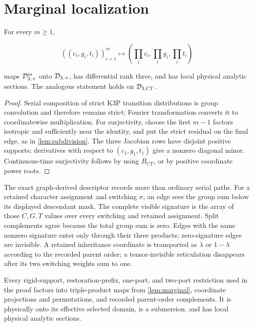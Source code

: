 \section{Marginal localization}\label{sec:localization}

\begin{lemma}\label{lem:marginal}
For every \(m\ge1\),

\[
 ((c_i,g_i,t_i))_{i=1}^m\longmapsto
 \left(\prod_i c_i,\prod_i g_i,\prod_i t_i\right)
\]

maps \(\mathcal D_{3,+}^m\) onto \(\mathcal D_{3,+}\), has differential rank three, and has local
physical analytic sections.  The analogous statement holds on \(\mathcal D_{3,\mathrm{CT}}\).
\end{lemma}

\begin{proof}
Serial composition of strict K3P transition distributions is group
convolution and therefore remains strict; Fourier transformation converts it
to coordinatewise multiplication.  For surjectivity, choose the first
\(m-1\) factors isotropic and sufficiently near the identity, and put the
strict residual on the final edge, as in \cref{lem:subdivision}.  The three
Jacobian rows have disjoint positive supports; derivatives with respect to
\((c_1,g_1,t_1)\) give a nonzero diagonal minor.  Continuous-time
surjectivity follows by using \(B_{\mathrm{CT}}\), or by positive coordinate
power roots.
\end{proof}

The exact graph-derived descriptor records more than ordinary serial paths.
For a retained character assignment and switching \(\sigma\), an edge sees
the group sum below its displayed descendant mask.  The complete visible
signature is the array of those \(C,G,T\) values over every switching and
retained assignment.  Split complements agree because the total group sum is
zero.  Edges with the same nonzero signature enter only through their three
products; zero-signature edges are invisible.  A retained inheritance
coordinate is transported as \(\lambda\) or \(1-\lambda\) according to the
recorded parent order; a tensor-invisible reticulation disappears after its
two switching weights sum to one.

\begin{proposition}\label{prop:marginal-descriptor}
Every rigid-support, restoration-prefix, one-port, and two-port restriction
used in the proof factors into triple-product maps from
\cref{lem:marginal}, coordinate projections and permutations, and recorded
parent-order complements.  It is physically onto its effective selected
domain, is a submersion, and has local physical analytic sections.
\end{proposition}

